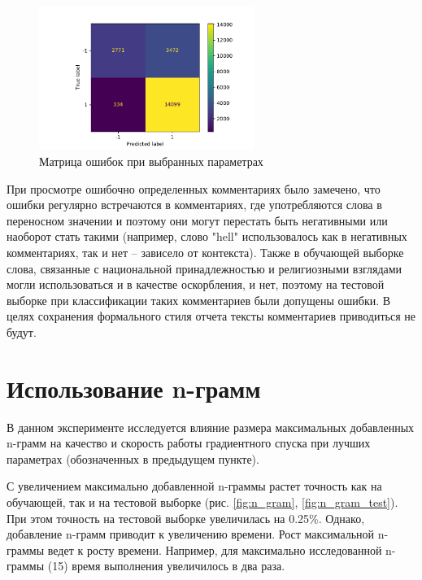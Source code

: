 \documentclass{article}
\begin{document}
\begin{figure}[H]
	\centering
	\includegraphics[width=7cm]{conf_mat.pdf}
	\caption{Матрица ошибок при выбранных параметрах}
	\label{fig:conf_mat}
\end{figure}

При просмотре ошибочно определенных комментариях было замечено, что ошибки регулярно встречаются в комментариях, где употребляются слова в переносном значении и поэтому они могут перестать быть негативными или наоборот стать такими (например, слово "hell"{ } использовалось как в негативных комментариях, так и нет – зависело от контекста). Также в обучающей выборке слова, связанные с национальной принадлежностью и религиозными взглядами могли использоваться и в качестве оскорбления, и нет, поэтому на тестовой выборке при классификации таких комментариев были допущены ошибки. В целях сохранения формального стиля отчета тексты комментариев приводиться не будут.

\section{Использование n-грамм}

В данном эксперименте исследуется влияние размера максимальных добавленных n-грамм на качество и скорость работы градиентного спуска при лучших параметрах (обозначенных в предыдущем пункте). 

С увеличением максимально добавленной n-граммы растет точность как на обучающей, так и на тестовой выборке (рис. \ref{fig:n_gram}, \ref{fig:n_gram_test}). При этом точность на тестовой выборке увеличилась на 0.25\%. Однако, добавление n-грамм приводит к увеличению времени. Рост максимальной n-граммы ведет к росту времени. Например, для максимально исследованной n-граммы (15) время выполнения увеличилось в два раза.
\end{document}

